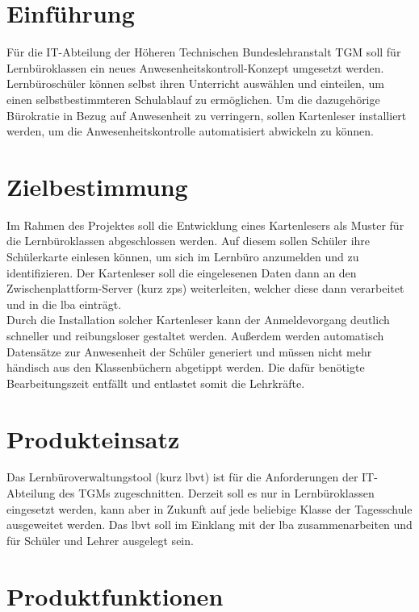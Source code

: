


\section{Einführung}
Für die IT-Abteilung der Höheren Technischen Bundeslehranstalt TGM soll für
Lernbüroklassen ein neues Anwesenheitskontroll-Konzept umgesetzt werden.
Lernbüroschüler können selbst ihren Unterricht auswählen und einteilen, um
einen selbstbestimmteren Schulablauf zu ermöglichen. Um die dazugehörige
Bürokratie in Bezug auf Anwesenheit zu verringern, sollen Kartenleser
installiert werden, um die Anwesenheitskontrolle automatisiert abwickeln zu
können.

\section{Zielbestimmung}
Im Rahmen des Projektes soll die Entwicklung eines Kartenlesers als Muster für die Lernbüroklassen abgeschlossen werden. Auf diesem sollen Schüler ihre Schülerkarte einlesen können, um sich im Lernbüro anzumelden und zu identifizieren. Der Kartenleser soll die eingelesenen Daten dann an den Zwischenplattform-Server (kurz \gls{zps}) weiterleiten, welcher diese dann verarbeitet und in die \gls{lba} einträgt.\\
Durch die Installation solcher Kartenleser kann der Anmeldevorgang deutlich schneller und reibungsloser gestaltet werden. Außerdem werden automatisch Datensätze zur Anwesenheit der Schüler generiert und müssen nicht mehr händisch aus den Klassenbüchern abgetippt werden. Die dafür benötigte Bearbeitungszeit entfällt und entlastet somit die Lehrkräfte.
\section{Produkteinsatz}
Das Lernbüroverwaltungstool (kurz \gls{lbvt}) ist für die Anforderungen der IT-Abteilung des TGMs zugeschnitten. Derzeit soll es nur in Lernbüroklassen eingesetzt werden, kann aber in Zukunft auf jede beliebige Klasse der Tagesschule ausgeweitet werden. Das \gls{lbvt} soll im Einklang mit der \gls{lba} zusammenarbeiten und für Schüler und Lehrer ausgelegt sein.
\section{Produktfunktionen}
